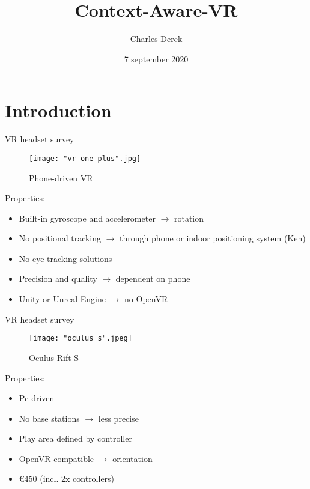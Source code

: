 \documentclass{beamer}
\title[Your Short Title]{Context-Aware-VR}
\author{Charles Derek}
\institute{University of Antwerp}
\date{7 september 2020}
\begin{document}
\begin{frame}
  \titlepage
\end{frame}


\section{Introduction}


\begin{frame}{VR headset survey}
	\begin{figure}
		\texttt{[image: "vr-one-plus".jpg]}
		\caption{Phone-driven VR}
	\end{figure}
	
	Properties:
	\begin{itemize}
		\item Built-in gyroscope and accelerometer $\rightarrow$ rotation
		\item No positional tracking $\rightarrow$ through phone or indoor positioning system (Ken)
		\item No eye tracking solutions
		\item Precision and quality $\rightarrow$ dependent on phone
		\item Unity or Unreal Engine $\rightarrow$ no OpenVR
	\end{itemize}
\end{frame}


\begin{frame}{VR headset survey}
	\begin{figure}
		\texttt{[image: "oculus\_s".jpeg]}
		\caption{Oculus Rift S}
	\end{figure}
	
	Properties:
	\begin{itemize}
		\item Pc-driven
	    \item No base stations $\rightarrow$ less precise
	    \item Play area defined by controller
      	\item OpenVR compatible $\rightarrow$ orientation
		\item €450 (incl. 2x controllers)
	\end{itemize}
\end{frame}
\end{document}
